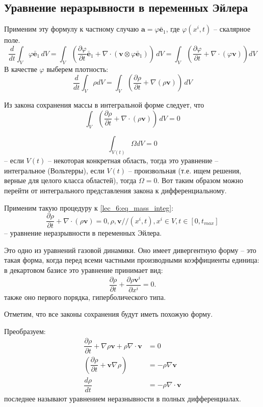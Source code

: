 \subsection{Уравнение неразрывности в переменных Эйлера}

Применим эту формулу к частному случаю $\mathbf{a} = \varphi \bar{\mathbf{e}}_1$, где
$\varphi(x^i, t)$ -- скалярное поле.
\[
  \dfrac{d}{dt} \int_V \varphi \bar{\mathbf{e}}_1 \, dV
  = \int_V \left( \dfrac{\partial \varphi}{\partial t} \bar{\mathbf{e}}_1 + \nabla \cdot \left( \mathbf{v} \otimes \varphi \bar{\mathbf{e}}_1 \right)  \right) \, dV
  = \int_V \left( \dfrac{\partial \varphi}{\partial t}  + \nabla \cdot (\varphi \mathbf{v}) \right) dV
\]
В качестве $\varphi$ выберем плотность:
\[
  \dfrac{d}{dt} \int_V \rho dV
  = \int_V \left( \dfrac{\partial \rho}{\partial t} + \nabla (\rho \mathbf{v}) \right) \, dV
\]

Из закона сохранения массы в интегральной форме следует, что 
\begin{equation}\label{lec_6:eq_mass_integ}
  \int_V \left( \dfrac{\partial \rho}{\partial t} + \nabla \cdot (\rho \mathbf{v}) \right) \, dV = 0
\end{equation}


\[
  \int_{V(t)} \Omega dV = 0
\]
-- если $V(t)$ -- некоторая конкретная область, тогда это уравнение -- интегральное
(Вольтерры), если $V(t)$ -- произвольная (т.е. ищем решения, верные для целого класса
областей), тогда $\Omega = 0$. Вот таким образом можно перейти от интегрального
представления закона к дифференциальному.

Применим такую процедуру к \eqref{lec_6:eq_mass_integ}:
\[
  \dfrac{\partial \rho}{\partial t}  + \nabla \cdot (\rho \mathbf{v}) = 0, 
  \rho, \mathbf{v} // (x^i, t), x^i \in V, t \in [0, t_{max}]
\]
-- уравнение неразрывности в переменных Эйлера. 

Это одно из уравнений газовой динамики. Оно имеет дивергентную форму --
это такая форма, когда перед всеми частными производными коэффициенты единица:
в декартовом базисе это уравнение принимает вид:
\[
  \dfrac{\partial \rho}{\partial t}  + \dfrac{\partial \rho \mathbf{v}^i}{\partial x^i} = 0.
\]
также оно первого порядка, гиперболического типа.

Отметим, что все законы сохранения будут иметь похожую форму.

Преобразуем:
\begin{align*}
  \dfrac{\partial \rho}{\partial t} + \nabla \rho \mathbf{v} + \rho \nabla \cdot \mathbf{v} &= 0 \\
  \left( \dfrac{\partial \rho}{\partial t} + \mathbf{v} \nabla \rho \right) &= - \rho \nabla \mathbf{v} \\
  \dfrac{d \rho}{dt} &= - \rho \nabla \cdot \mathbf{v}
\end{align*}
последнее называют уравнением неразнывности в полных дифференциалах.

